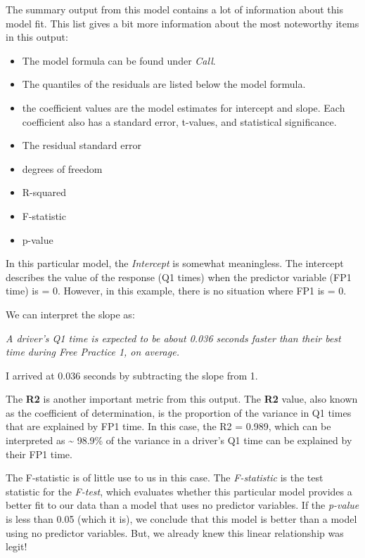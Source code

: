 \documentclass[
]{book}
\providecommand{\tightlist}{%
  \setlength{\itemsep}{0pt}\setlength{\parskip}{0pt}}
\begin{document}
The summary output from this model contains a lot of information about this model fit. This list gives a bit more information about the most noteworthy items in this output:

\begin{itemize}
\tightlist
\item
  The model formula can be found under \emph{Call}.
\item
  The quantiles of the residuals are listed below the model formula.
\item
  the coefficient values are the model estimates for intercept and slope. Each coefficient also has a standard error, t-values, and statistical significance.
\item
  The residual standard error
\item
  degrees of freedom
\item
  R-squared
\item
  F-statistic
\item
  p-value
\end{itemize}

In this particular model, the \emph{Intercept} is somewhat meaningless. The intercept describes the value of the response (Q1 times) when the predictor variable (FP1 time) is = 0. However, in this example, there is no situation where FP1 is = 0.

We can interpret the slope as:

\emph{A driver's Q1 time is expected to be about 0.036 seconds faster than their best time during Free Practice 1, on average.}

I arrived at 0.036 seconds by subtracting the slope from 1.

The \textbf{R2} is another important metric from this output. The \textbf{R2} value, also known as the coefficient of determination, is the proportion of the variance in Q1 times that are explained by FP1 time. In this case, the R2 = 0.989, which can be interpreted as \textasciitilde{} 98.9\% of the variance in a driver's Q1 time can be explained by their FP1 time.

The F-statistic is of little use to us in this case. The \emph{F-statistic} is the test statistic for the \emph{F-test}, which evaluates whether this particular model provides a better fit to our data than a model that uses no predictor variables. If the \emph{p-value} is less than 0.05 (which it is), we conclude that this model is better than a model using no predictor variables. But, we already knew this linear relationship was legit!
\end{document}

